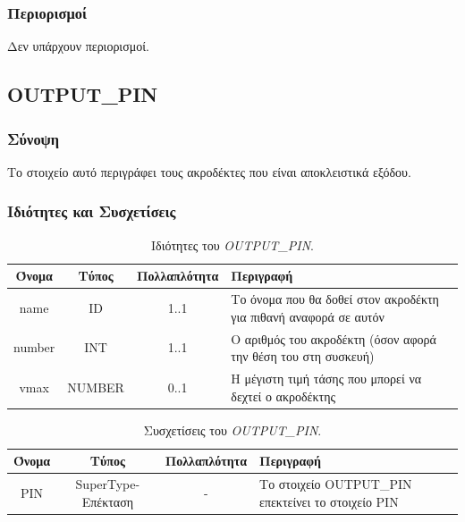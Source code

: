 \subsubsection*{Περιορισμοί}

\noindent Δεν υπάρχουν περιορισμοί.

\subsection{OUTPUT\_PIN}
\label{subsec:output_pin}

\subsubsection*{Σύνοψη}

\noindent Το στοιχείο αυτό περιγράφει τους ακροδέκτες που είναι αποκλειστικά εξόδου.

\subsubsection*{Ιδιότητες και Συσχετίσεις}

\begin{table}[H]
	\begin{center}
		\caption{Ιδιότητες του \textit{OUTPUT\_PIN}.}
		\label{tab:output_pin1}
		\begin{tabular}{ | c | c | c| m{5.5cm} | }
			\hline
			\rowcolor{Gray}
			Όνομα & Τύπος & Πολλαπλότητα & Περιγραφή \\
			\hline
			name & ID & 1..1 & Το όνομα που θα δοθεί στον ακροδέκτη για πιθανή αναφορά σε αυτόν \\
			\hline
			number & INT & 1..1 & Ο αριθμός του ακροδέκτη (όσον αφορά την θέση του στη συσκευή) \\
			\hline
			vmax & NUMBER & 0..1 & Η μέγιστη τιμή τάσης που μπορεί να δεχτεί ο ακροδέκτης \\
			\hline
		\end{tabular}
	\end{center}
\end{table}

\begin{table}[H]
	\begin{center}
		\caption{Συσχετίσεις του \textit{OUTPUT\_PIN}.}
		\label{tab:output_pin2}
		\begin{tabular}{ | c | c | c| m{5.5cm} | }
			\hline
			\rowcolor{Gray}
			Όνομα & Τύπος & Πολλαπλότητα & Περιγραφή \\
			\hline
			PIN & SuperType-Επέκταση & - &  Το στοιχείο OUTPUT\_PIN επεκτείνει το στοιχείο PIN \\
			\hline
		\end{tabular}
	\end{center}
\end{table}


